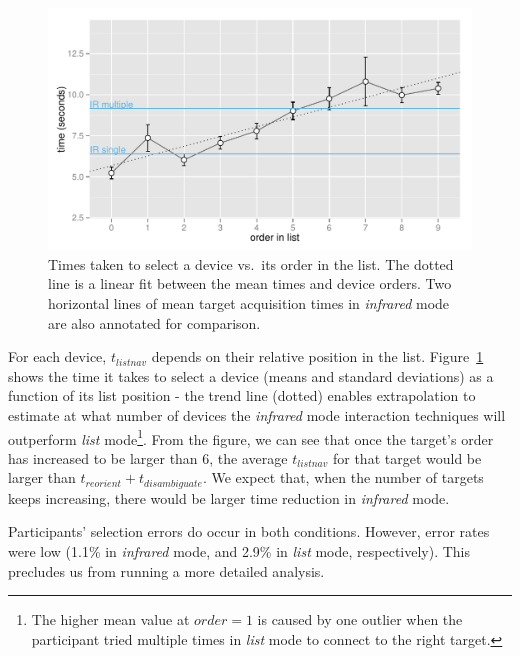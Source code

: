 \documentclass{sigchi}
\begin{document}
\begin{figure}[t]
\centering
\includegraphics[width=1.0\columnwidth]{figures/R_List_by_Target.pdf}
\caption{Times taken to select a device vs.~its order in the list. The dotted line is a linear fit between the mean times and device orders. Two horizontal lines of mean target acquisition times in {\em infrared} mode are also annotated for comparison.}
\label{fig:time-vs-list-order}
\end{figure}

For each device, $t_{listnav}$ depends on their relative position in the list. Figure~\ref{fig:time-vs-list-order} shows the time it takes to select a device (means and standard deviations) as a function of its list position - the trend line (dotted) enables extrapolation to estimate at what number of devices the {\em infrared} mode interaction techniques will outperform {\em list} mode\footnote{The higher mean value at $order=1$ is caused by one outlier when the participant tried multiple times in {\em list} mode to connect to the right target.}. From the figure, we can see that once the target's order has increased to be larger than 6, the average $t_{listnav}$ for that target would be larger than $t_{reorient} + t_{disambiguate}$. We expect that, when the number of targets keeps increasing, there would be larger time reduction in {\em infrared} mode.

Participants' selection errors do occur in both conditions. However, error rates were low (1.1\% in {\em infrared} mode, and 2.9\% in {\em list} mode, respectively). This precludes us from running a more detailed analysis. 
\end{document}
